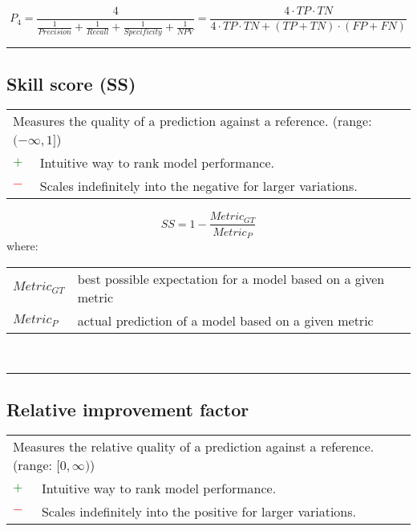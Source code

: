 \documentclass{article}
\makeatletter
\newenvironment{conditions}[1][where:]
	{\hspace{0.02\textwidth} #1 \begin{tabular}[t]{>{$}l<{$} @{${}={}$} l}}
	{\end{tabular}\\[\belowdisplayskip]}
\makeatother
\begin{document}
\begin{equation}
	P_4 = \dfrac{4}{\frac{1}{\textit{Precision}} + \frac{1}{\textit{Recall}} + \frac{1}{\textit{Specificity}} + \frac{1}{\textit{NPV}}} = \dfrac{4 \cdot \textit{TP} \cdot \textit{TN}}{4 \cdot \textit{TP} \cdot \textit{TN} + (\textit{TP} + \textit{TN}) \cdot (\textit{FP} + \textit{FN})}
%
	\label{equation:P4_metric}
\end{equation}

\hrule


\subsection[Skill score (SS)]{Skill score (SS) \cite{murphy1988skill}}

\begin{table}[H]\centering
	\begin{tabular}{m{}m{}}
		\multicolumn{2}{m{0.95\textwidth}}{Measures the quality of a prediction against a reference. (range: $(-\infty, 1]$)} \\
		\textcolor{Green}{$+$} & Intuitive way to rank model performance. \\
		\textcolor{Red}{$-$}   & Scales indefinitely into the negative for larger variations.
	\end{tabular}
\end{table}

\begin{equation}
	\textit{SS} = 1 - \dfrac{\textit{Metric}_{\textit{GT}}}{\textit{Metric}_P}
%
	\label{equation:SS}
\end{equation}
%
\begin{conditions}
	\textit{Metric}_{\textit{GT}} & best possible expectation for a model based on a given metric \\
	\textit{Metric}_P             & actual prediction of a model based on a given metric
\end{conditions}

\hrule


\subsection[Relative improvement factor]{Relative improvement factor \cite{schlosser2022improving}}

\begin{table}[H]\centering
	\begin{tabular}{m{}m{}}
		\multicolumn{2}{m{0.95\textwidth}}{Measures the relative quality of a prediction against a reference. (range: $[0, \infty)$)} \\
		\textcolor{Green}{$+$} & Intuitive way to rank model performance. \\
		\textcolor{Red}{$-$}   & Scales indefinitely into the positive for larger variations.
	\end{tabular}
\end{table}
\end{document}
